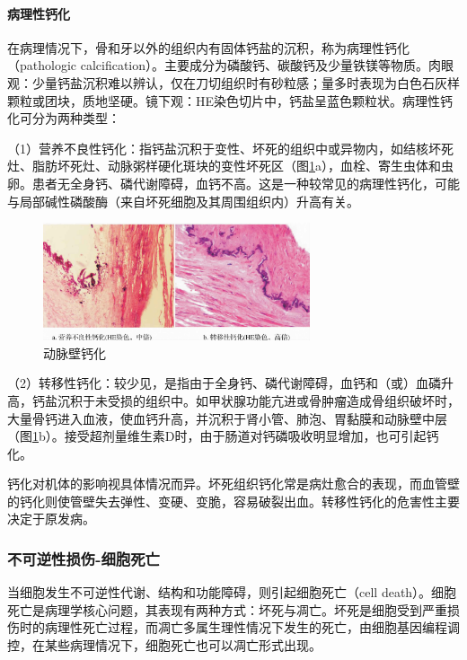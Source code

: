 \paragraph{病理性钙化}
在病理情况下，骨和牙以外的组织内有固体钙盐的沉积，称为病理性钙化（pathologic
calcification）。主要成分为磷酸钙、碳酸钙及少量铁镁等物质。肉眼观：少量钙盐沉积难以辨认，仅在刀切组织时有砂粒感；量多时表现为白色石灰样颗粒或团块，质地坚硬。镜下观：HE染色切片中，钙盐呈蓝色颗粒状。病理性钙化可分为两种类型：

（1）营养不良性钙化：指钙盐沉积于变性、坏死的组织中或异物内，如结核坏死灶、脂肪坏死灶、动脉粥样硬化斑块的变性坏死区（图\ref{fig1-12}a），血栓、寄生虫体和虫卵。患者无全身钙、磷代谢障碍，血钙不高。这是一种较常见的病理性钙化，可能与局部碱性磷酸酶（来自坏死细胞及其周围组织内）升高有关。

\begin{figure}[!htbp]
	\centering
	\includegraphics[width=0.7\textwidth]{./images/Image00013.jpg}
	\caption{动脉壁钙化}
	\label{fig1-12}
\end{figure}

（2）转移性钙化：较少见，是指由于全身钙、磷代谢障碍，血钙和（或）血磷升高，钙盐沉积于未受损的组织中。如甲状腺功能亢进或骨肿瘤造成骨组织破坏时，大量骨钙进入血液，使血钙升高，并沉积于肾小管、肺泡、胃黏膜和动脉壁中层（图\ref{fig1-12}b）。接受超剂量维生素D时，由于肠道对钙磷吸收明显增加，也可引起钙化。

钙化对机体的影响视具体情况而异。坏死组织钙化常是病灶愈合的表现，而血管壁的钙化则使管壁失去弹性、变硬、变脆，容易破裂出血。转移性钙化的危害性主要决定于原发病。

\subsubsection{不可逆性损伤-细胞死亡}

当细胞发生不可逆性代谢、结构和功能障碍，则引起细胞死亡（cell
death）。细胞死亡是病理学核心问题，其表现有两种方式：坏死与凋亡。坏死是细胞受到严重损伤时的病理性死亡过程，而凋亡多属生理性情况下发生的死亡，由细胞基因编程调控，在某些病理情况下，细胞死亡也可以凋亡形式出现。

